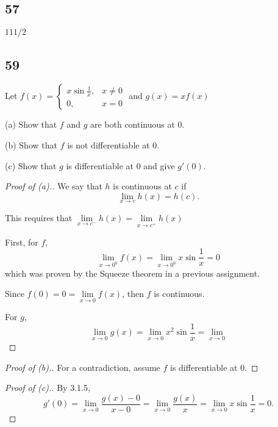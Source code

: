 \documentclass[../hw3.tex]{subfiles}
\begin{document}
\subsection*{57}
$111/2$


\subsection*{59}
Let $f(x) = \begin{cases}
    x\sin{\frac{1}{x}}, & x \neq 0 \\
    0, & x = 0 
\end{cases}$ and $g(x) = xf(x)$

(a) Show that $f$ and $g$ are both continuous at 0.

(b) Show that $f$ is not differentiable at 0.

(c) Show that $g$ is differentiable at 0 and give $g'(0)$.

\begin{proof}[Proof of (a).]
    We say that $h$ is continuous at $c$ if \[\lim\limits_{x \to c} h(x) = h(c).\]

    This requires that $\lim\limits_{x \to c^-} h(x) = \lim\limits_{x \to c^+} h(x)$

    First, for $f$, 
    \[\lim\limits_{x \to 0^0} f(x) = \lim\limits_{x \to 0^0} x\sin{\frac{1}{x}} = 0\]
    which was proven by the Squeeze theorem in a previous assignment.

    Since $f(0) = 0 = \lim\limits_{x \to 0} f(x)$, then $f$ is continuous.

    For $g$, \[\lim\limits_{x \to 0} g(x) = \lim\limits_{x \to 0} x^2\sin{\frac{1}{x}} = \lim\limits_{x \to 0} \]

\end{proof}

\begin{proof}[Proof of (b).]
    For a contradiction, assume $f$ is differentiable at 0. 

\end{proof}

\begin{proof}[Proof of (c).]
    By 3.1.5, \[g'(0) = \lim\limits_{x \to 0} \frac{g(x)-0}{x-0} = \lim\limits_{x \to 0} \frac{g(x)}{x} = \lim\limits_{x \to 0} x\sin{\frac{1}{x}} = 0.\]
\end{proof}
\end{document}
